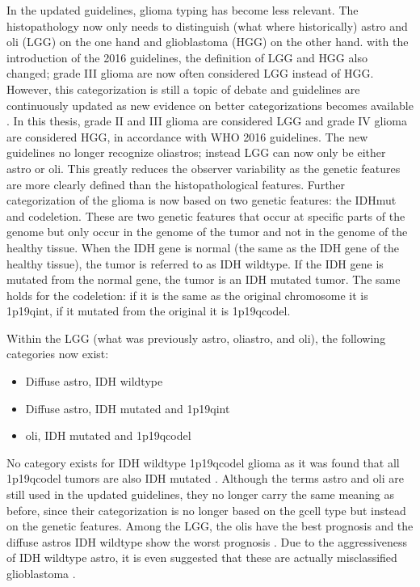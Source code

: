 In the updated guidelines, \gls{glioma} typing has become less relevant.
The histopathology now only needs to distinguish (what where historically) \gls{astro} and \gls{oli} (\gls{LGG}) on the one hand and \gls{glioblastoma} (\gls{HGG}) on the other hand.
with the introduction of the 2016 guidelines, the definition of \gls{LGG} and \gls{HGG} also changed; grade III \gls{glioma} are now often considered \gls{LGG} instead of \gls{HGG}.
However, this categorization is still a topic of debate and guidelines are continuously updated as new evidence on better categorizations becomes available \autocite{lous2020impactnow}.
In this thesis, grade II and III \gls{glioma} are considered \gls{LGG} and grade IV \gls{glioma} are considered \gls{HGG}, in accordance with \gls{WHO} 2016 guidelines.
The new guidelines no longer recognize \glspl{oliastro}; instead \gls{LGG} can now only be either \gls{astro} or \gls{oli}.
This greatly reduces the observer variability as the genetic features are more clearly defined than the histopathological features.
Further categorization of the \gls{glioma} is now based on two genetic features:  the \gls{IDHmut} and \gls{codeletion}.
These are two genetic features that occur at specific parts of the genome but only occur in the genome of the \gls{tumor} and not in the genome of the healthy tissue.
When the \gls{IDH} gene is normal (the same as the \gls{IDH} gene of the healthy tissue), the \gls{tumor} is referred to as \gls{IDH} wildtype.
If the \gls{IDH} gene is mutated from the normal gene, the \gls{tumor} is an \gls{IDH} mutated \gls{tumor}.
The same holds for the \gls{codeletion}: if it is the same as the original chromosome it is \acl{1p19qint}, if it mutated from the original it is \acl{1p19qcodel}.

Within the \gls{LGG} (what was previously \gls{astro}, \gls{oliastro}, and \gls{oli}), the following categories now exist:
\begin{itemize}
    \item Diffuse \gls{astro}, \gls{IDH} wildtype
    \item Diffuse \gls{astro}, \gls{IDH} mutated and \acl{1p19qint}
    \item \Gls{oli}, \gls{IDH} mutated and \acl{1p19qcodel}
\end{itemize}
No category exists for \gls{IDH} wildtype \acl{1p19qcodel} \gls{glioma} as it was found that all \acl{1p19qcodel} \glspl{tumor} are also \gls{IDH} mutated \autocite{labussi20101p19qcodeletedIDH}.
Although the terms \gls{astro} and \gls{oli} are still used in the updated guidelines, they no longer carry the same meaning as before, since their categorization is no longer based on the \gls{gcell} type but instead on the genetic features.
Among the \gls{LGG}, the \glspl{oli} have the best prognosis and the diffuse \glspl{astro} \gls{IDH} wildtype show the worst prognosis \autocite{eckel2015gliomagroups}.
Due to the aggressiveness of \gls{IDH} wildtype \gls{astro}, it is even suggested that these are actually misclassified \gls{glioblastoma} \autocite{hartmann2010IDH1gbm, brat2018IMPACT}.




